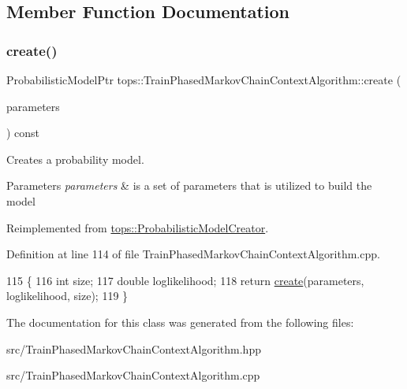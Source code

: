 \subsection{Member Function Documentation}
\mbox{\label{classtops_1_1TrainPhasedMarkovChainContextAlgorithm_aa97236d43efb5312776d41ae36827d08}} 
\subsubsection{\texorpdfstring{create()}{create()}}
{\footnotesize\ttfamily Probabilistic\+Model\+Ptr tops\+::\+Train\+Phased\+Markov\+Chain\+Context\+Algorithm\+::create (\begin{DoxyParamCaption}\item[{\hyperlink{classtops_1_1ProbabilisticModelParameters}{Probabilistic\+Model\+Parameters} \&}]{parameters }\end{DoxyParamCaption}) const\hspace{0.3cm}{\ttfamily [virtual]}}



Creates a probability model. 


\begin{DoxyParams}{Parameters}
{\em parameters} & is a set of parameters that is utilized to build the model \\
\hline
\end{DoxyParams}


Reimplemented from \hyperlink{classtops_1_1ProbabilisticModelCreator_afed6c8ffa45fff446bdaa8b533da8f7c}{tops\+::\+Probabilistic\+Model\+Creator}.



Definition at line 114 of file Train\+Phased\+Markov\+Chain\+Context\+Algorithm.\+cpp.


\begin{DoxyCode}
115                                                                  \{
116         \textcolor{keywordtype}{int} size;
117         \textcolor{keywordtype}{double} loglikelihood;
118         \textcolor{keywordflow}{return} \hyperlink{classtops_1_1TrainPhasedMarkovChainContextAlgorithm_aa97236d43efb5312776d41ae36827d08}{create}(parameters, loglikelihood, size);
119 \}
\end{DoxyCode}


The documentation for this class was generated from the following files\+:\begin{DoxyCompactItemize}
\item 
src/Train\+Phased\+Markov\+Chain\+Context\+Algorithm.\+hpp\item 
src/Train\+Phased\+Markov\+Chain\+Context\+Algorithm.\+cpp\end{DoxyCompactItemize}
